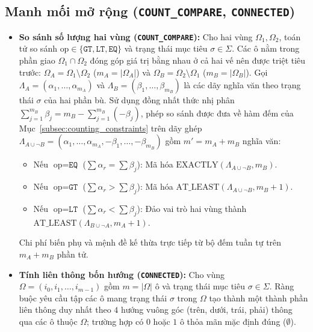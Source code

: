 \subsection{Manh mối mở rộng (\texttt{COUNT\_COMPARE}, \texttt{CONNECTED})}
\begin{itemize}
    \item \textbf{So sánh số lượng hai vùng (\texttt{COUNT\_COMPARE}):} Cho hai vùng $\Omega_1, \Omega_2$, toán tử so sánh $\text{op} \in \{\texttt{GT}, \texttt{LT}, \texttt{EQ}\}$ và trạng thái mục tiêu $\sigma \in \Sigma$. Các ô nằm trong phần giao $\Omega_1 \cap \Omega_2$ đóng góp giá trị bằng nhau ở cả hai vế nên được triệt tiêu trước: $\Omega_A = \Omega_1 \setminus \Omega_2$ ($m_A = |\Omega_A|$) và $\Omega_B = \Omega_2 \setminus \Omega_1$ ($m_B = |\Omega_B|$). Gọi $\Lambda_A = (\alpha_1, \dots, \alpha_{m_A})$ và $\Lambda_B = (\beta_1, \dots, \beta_{m_B})$ là các dãy nghĩa văn theo trạng thái $\sigma$ của hai phần bù. Sử dụng đồng nhất thức nhị phân $\sum_{j=1}^{m_B} \beta_j = m_B - \sum_{j=1}^{m_B} (-\beta_j)$, phép so sánh được đưa về hàm đếm của Mục~\ref{subsec:counting_constraints} trên dãy ghép $\Lambda_{A \cup \neg B} = (\alpha_1, \dots, \alpha_{m_A}, -\beta_1, \dots, -\beta_{m_B})$ gồm $m' = m_A + m_B$ nghĩa văn:
    \begin{itemize}
        \item Nếu $\text{op} = \texttt{EQ}$ ($\sum \alpha_r = \sum \beta_j$): Mã hóa $\text{EXACTLY}(\Lambda_{A \cup \neg B}, m_B)$.
        \item Nếu $\text{op} = \texttt{GT}$ ($\sum \alpha_r > \sum \beta_j$): Mã hóa $\text{AT\_LEAST}(\Lambda_{A \cup \neg B}, m_B + 1)$.
        \item Nếu $\text{op} = \texttt{LT}$ ($\sum \alpha_r < \sum \beta_j$): Đảo vai trò hai vùng thành $\text{AT\_LEAST}(\Lambda_{B \cup \neg A}, m_A + 1)$.
    \end{itemize}
    Chi phí biến phụ và mệnh đề kế thừa trực tiếp từ bộ đếm tuần tự trên $m_A + m_B$ phần tử.

    \item \textbf{Tính liên thông bốn hướng (\texttt{CONNECTED}):} Cho vùng $\Omega = (i_0, i_1, \dots, i_{m-1})$ gồm $m = |\Omega|$ ô và trạng thái mục tiêu $\sigma \in \Sigma$. Ràng buộc yêu cầu tập các ô mang trạng thái $\sigma$ trong $\Omega$ tạo thành một thành phần liên thông duy nhất theo $4$ hướng vuông góc (trên, dưới, trái, phải) thông qua các ô thuộc $\Omega$; trường hợp có $0$ hoặc $1$ ô thỏa mãn mặc định đúng ($\emptyset$).
    

\end{itemize}
